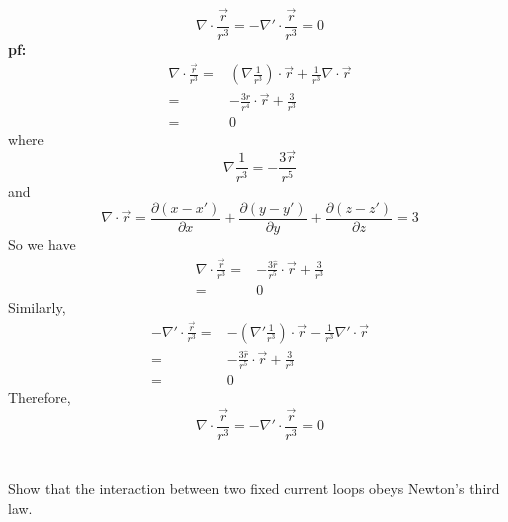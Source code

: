 \documentclass[10pt,a4paper]{article}
\begin{document}
\subsection{}
\[
\nabla\cdot\frac{\vec{r}}{r^3}=-\nabla'\cdot\frac{\vec{r}}{r^3}=0
\]
\textbf{pf:}
\begin{align*}
\nabla\cdot\frac{\vec{r}}{r^3}=&(\nabla\frac{1}{r^3})\cdot\vec{r}+\frac{1}{r^3}\nabla\cdot\vec{r}\\
=&-\frac{3\hat{r}}{r^4}\cdot\vec{r}+\frac{3}{r^3}\\
=&0
\end{align*}
where
\[
\nabla\frac{1}{r^3}=-\frac{3\vec{r}}{r^5}
\]
and
\[
\nabla\cdot\vec{r}=\frac{\partial(x-x')}{\partial x}+\frac{\partial(y-y')}{\partial y}+\frac{\partial(z-z')}{\partial z}=3
\]
So we have
\begin{align*}
\nabla\cdot\frac{\vec{r}}{r^3}=&-\frac{3\hat{r}}{r^5}\cdot\vec{r}+\frac{3}{r^3}\\
=&0
\end{align*}
Similarly,
\begin{align*}
-\nabla'\cdot\frac{\vec{r}}{r^3}=&-(\nabla'\frac{1}{r^3})\cdot\vec{r}-\frac{1}{r^3}\nabla'\cdot\vec{r}\\
=&-\frac{3\hat{r}}{r^5}\cdot\vec{r}+\frac{3}{r^3}\\
=&0
\end{align*}
Therefore,
\[
\nabla\cdot\frac{\vec{r}}{r^3}=-\nabla'\cdot\frac{\vec{r}}{r^3}=0
\]
\section{}
Show that the interaction between two fixed current loops obeys Newton's third law.
\end{document}
